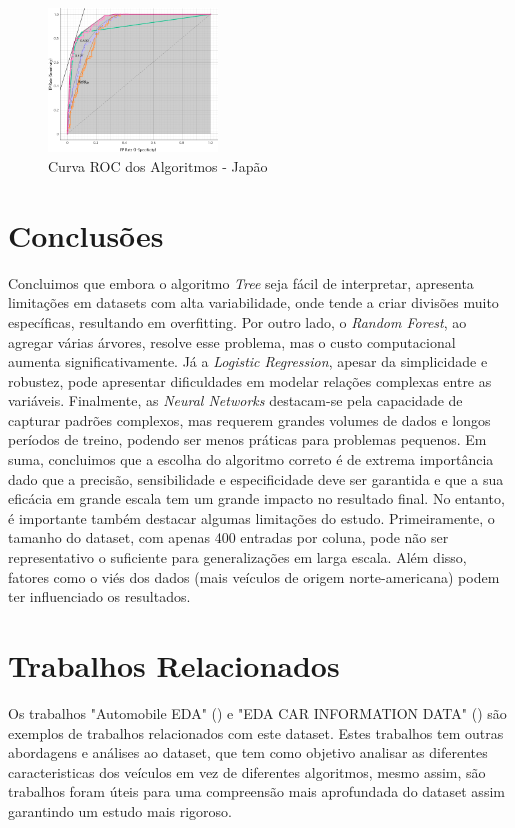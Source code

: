 \documentclass[conference]{IEEEtran}
\begin{document}
\begin{figure}[!ht]
	\centering
	\includegraphics[width=0.4\textwidth]{Resources/ROC_JP.png}
	\caption{Curva ROC dos Algoritmos - Japão}
\end{figure}


\newpage
\section{Conclusões}
Concluimos que embora o algoritmo \textit{Tree} seja fácil de interpretar, apresenta limitações em datasets com alta variabilidade,
onde tende a criar divisões muito específicas, resultando em overfitting. Por outro lado, o \textit{Random Forest}, ao agregar várias
árvores, resolve esse problema, mas o custo computacional aumenta significativamente. Já a \textit{Logistic Regression}, apesar da
simplicidade e robustez, pode apresentar dificuldades em modelar relações complexas entre as variáveis. Finalmente, as \textit{Neural Networks}
destacam-se pela capacidade de capturar padrões complexos, mas requerem grandes volumes de dados e longos períodos de treino, podendo
ser menos práticas para problemas pequenos. Em suma, concluimos que a escolha do algoritmo correto é de extrema importância dado que
a precisão, sensibilidade e especificidade deve ser garantida e que a sua eficácia em grande escala tem um grande impacto no resultado final.
No entanto, é importante também destacar algumas limitações do estudo. Primeiramente, o tamanho do dataset, com apenas 400 entradas por coluna,
pode não ser representativo o suficiente para generalizações em larga escala. Além disso, fatores como o viés dos dados
(mais veículos de origem norte-americana) podem ter influenciado os resultados.

\section{Trabalhos Relacionados}
Os trabalhos "Automobile EDA" (\cite{ref2}) e "EDA CAR INFORMATION DATA" (\cite{ref3}) são exemplos de trabalhos relacionados com este dataset.
Estes trabalhos tem outras abordagens e análises ao dataset, que tem como objetivo analisar as diferentes caracteristicas dos veículos
em vez de diferentes algoritmos, mesmo assim, são trabalhos foram úteis para uma compreensão mais aprofundada do dataset assim garantindo
um estudo mais rigoroso.

\printbibliography
\end{document}
